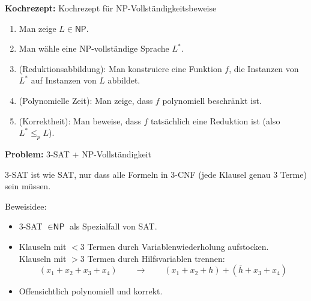 \documentclass[a4paper,graphics,11pt]{article}
\begin{document}
\newpage

\textbf{Kochrezept:} Kochrezept für \textsf{NP}-Vollständigkeitsbeweise

\begin{enumerate}
    \item Man zeige $L \in \textsf{NP}$.
    \item Man wähle eine \textsf{NP}-vollständige Sprache $L^*$.
    \item (Reduktionsabbildung): Man konstruiere eine Funktion $f$, die Instanzen von $L^*$ auf
        Instanzen von $L$ abbildet.
    \item (Polynomielle Zeit): Man zeige, dass $f$ polynomiell beschränkt ist.
    \item (Korrektheit): Man beweise, dass $f$ tatsächlich eine Reduktion ist
        (also $L^* \leq_p L$).
\end{enumerate}

\strut

\textbf{Problem:} 3-SAT + \textsf{NP}-Vollständigkeit

3-SAT ist wie SAT, nur dass alle Formeln in 3-CNF (jede Klausel genau 3 Terme) sein müssen.

Beweisidee:
\begin{itemize}
    \item 3-SAT $\in \textsf{NP}$ als Spezialfall von SAT.
    \item Klauseln mit $< 3$ Termen durch Variablenwiederholung aufstocken.\\
        Klauseln mit $> 3$ Termen durch Hilfsvariablen trennen:
        $$
            (x_1 + x_2 + x_3 + x_4)
            \qquad\rightarrow\qquad
            (x_1 + x_2 + h) + (\overline{h} + x_3 + x_4)
        $$
    \item Offensichtlich polynomiell und korrekt.
\end{itemize}

\newpage

\section{}
\end{document}
